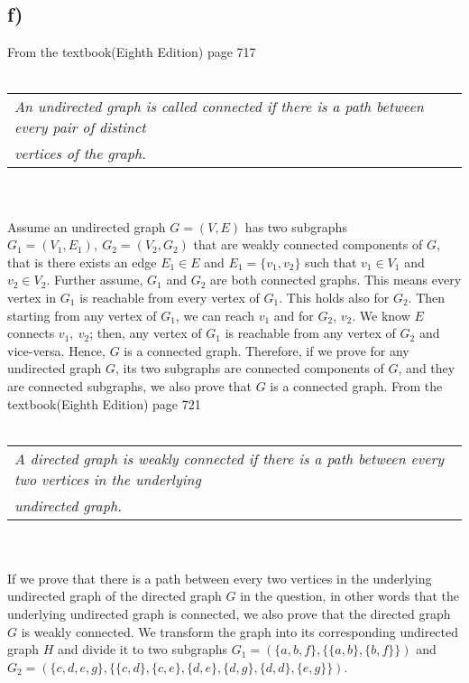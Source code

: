 \documentclass[11pt]{article}
\begin{document}
\subsection*{f)}
From the textbook(Eighth Edition) page 717
\\ \\
\begin{tabular}{l}
    \textit{An undirected graph is called connected if there is a path between every pair of distinct}\\
    \textit{vertices of the graph.}   
\end{tabular}
\\ \\
Assume an undirected graph $G=(V,E)$ has two subgraphs $G_1=(V_1,E_1),\ G_2=(V_2,G_2)$ that are weakly connected components of $G$, 
that is there exists an edge $E_1 \in E$ and $E_1=\{v_1,v_2\}$ such that $v_1 \in V_1$ and $v_2 \in V_2$. Further assume, $G_1$ and $G_2$
are both connected graphs. This means every vertex in $G_1$ is reachable from every vertex of $G_1$. This holds also for
$G_2$. Then starting from any vertex of $G_1$, we can reach $v_1$ and for $G_2$, $v_2$. We know $E$ connects $v_1,\ v_2$; then, any 
vertex of $G_1$ is reachable from any vertex of $G_2$ and vice-versa. Hence, $G$ is a connected graph. Therefore, if we prove for 
any undirected graph $G$, its two subgraphs are connected components of $G$, and they are connected subgraphs, we also prove that $G$ is a 
connected graph. From the textbook(Eighth Edition) page 721
\\ \\
\begin{tabular}{l}
    \textit{A directed graph is weakly connected if there is a path between every two vertices in the underlying}\\
    \textit{undirected graph.}   
\end{tabular}
\\ \\
If we prove that there is a path between every two vertices in the underlying undirected graph of the directed graph 
$G$ in the question, in other words that the underlying undirected graph is connected, we also prove that the directed
graph $G$ is weakly connected. We transform the graph into its corresponding undirected graph $H$ and divide it to two 
subgraphs $G_1=(\{a,b,f\},\{\{a,b\},\{b,f\}\})$ and $G_2=(\{c,d,e,g\},\{\{c,d\},\{c,e\},\{d,e\},\{d,g\},\{d,d\},\{e,g\}\})$.
\\ \\
\end{document}
